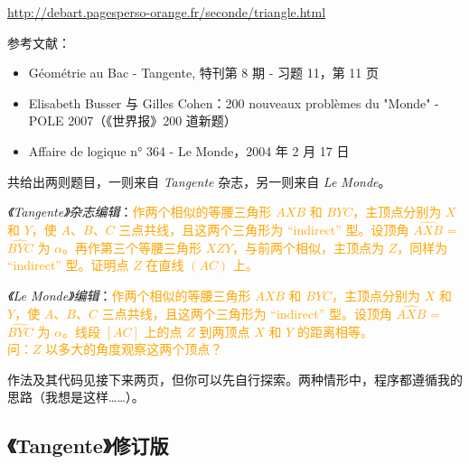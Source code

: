 \url{http://debart.pagesperso-orange.fr/seconde/triangle.html}

参考文献：

\begin{itemize}
\item   Géométrie au Bac - Tangente, 特刊第 8 期 - 习题 11，第 11 页

\item   Elisabeth Busser 与 Gilles Cohen：200 nouveaux problèmes du "Monde" - POLE 2007（《世界报》200 道新题）

\item   Affaire de logique n° 364 - Le Monde，2004 年 2 月 17 日
\end{itemize}


共给出两则题目，一则来自 \textit{Tangente} 杂志，另一则来自 \textit{Le Monde}。

\vspace*{2cm}
\emph{《Tangente》杂志编辑}：\textcolor{orange}{作两个相似的等腰三角形 $AXB$ 和 $BYC$，主顶点分别为 $X$ 和 $Y$，使 $A$、$B$、$C$ 三点共线，且这两个三角形为 ``indirect'' 型。设顶角 $\widehat{AXB}$ = $\widehat{BYC}$ 为 $\alpha$。再作第三个等腰三角形 $XZY$，与前两个相似，主顶点为 $Z$，同样为 ``indirect'' 型。证明点 $Z$ 在直线 $(AC)$ 上。}

\vspace*{2cm}
\emph{《Le Monde》编辑}：\textcolor{orange}{作两个相似的等腰三角形 $AXB$ 和 $BYC$，主顶点分别为 $X$ 和 $Y$，使 $A$、$B$、$C$ 三点共线，且这两个三角形为 ``indirect'' 型。设顶角 $\widehat{AXB}$ = $\widehat{BYC}$ 为 $\alpha$。线段 $[AC]$ 上的点 $Z$ 到两顶点 $X$ 和 $Y$ 的距离相等。\\
问：$Z$ 以多大的角度观察这两个顶点？}

\vspace*{2cm} 作法及其代码见接下来两页，但你可以先自行探索。两种情形中，程序都遵循我的思路（我想是这样……）。

\subsection{《Tangente》修订版}
\begin{tkzexample}[]
\end{tkzexample}

